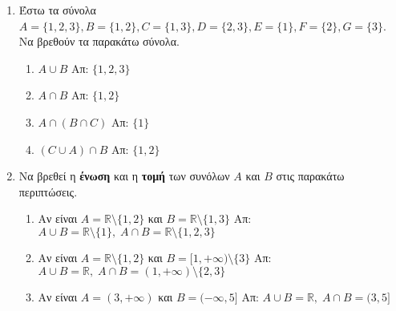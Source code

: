 \documentclass[a4paper]{report}
\begin{document}
\begin{center}
  \minibox{\large\bfseries \textcolor{Col1}{Ασκήσεις στα Σύνολα}}
\end{center}

\vspace{\baselineskip}

\begin{enumerate}
  \item Έστω τα σύνολα $A=\{1,2,3\}, B=\{1,2\}, C=\{1,3\}, D=\{2,3\}, E=\{1\}, 
    F=\{2\}, G=\{3\}$. Να βρεθούν τα παρακάτω σύνολα.
    \begin{enumerate}[label=(\roman*)]
      \item $A\cup B$ \hfill Απ: $ \{ 1,2,3 \} $ 
      \item $A\cap B$ \hfill Απ: $ \{ 1,2 \} $ 
      \item $A\cap (B\cap C)$ \hfill Απ: $ \{ 1 \} $ 
      \item $(C\cup A)\cap B$ \hfill Απ: $ \{ 1,2 \} $ 
    \end{enumerate}

  \item Να βρεθεί η \textbf{ένωση} και η \textbf{τομή} των συνόλων $A$ και $B$ στις 
    παρακάτω περιπτώσεις.
    \begin{enumerate}[(\roman*)]
      \item Αν είναι $A=\mathbb{R}\setminus\{1,2\}$ και $B=\mathbb{R}\setminus\{1,3\}$
        \hfill Απ: $ A \cup B = \mathbb{R} \setminus \{ 1 \}, \; A \cap B = \mathbb{R}
        \setminus \{ 1,2,3 \} $ 
      \item Αν είναι $A=\mathbb{R}\setminus\{1,2\}$ και $B=[1,+\infty) \setminus 
        \{ 3 \} $
        \hfill Απ: $ A \cup B = \mathbb{R}, \; A \cap B = (1,+\infty) 
        \setminus \{ 2,3 \}$ 
      \item Αν είναι $A=(3,+\infty)$ και $B=(-\infty,5]$
        \hfill Απ: $ A \cup B = \mathbb{R}, \; A \cap B = (3,5]  $ 
    \end{enumerate}


\end{enumerate}
\end{document}
